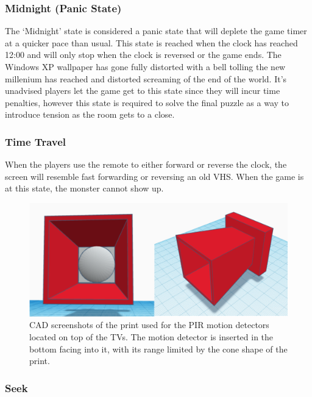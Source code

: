 \documentclass[conference]{IEEEtran}
\begin{document}
\subsubsection{Midnight (Panic State)}

\indent The `Midnight' state is considered a panic state that will deplete the game timer at a quicker pace than usual. This state is reached when
the clock has reached 12:00 and will only stop when the clock is reversed or the game ends. The Windows XP wallpaper has gone fully distorted with
a bell tolling the new millenium has reached and distorted screaming of the end of the world. It's unadvised players let the game get to this state
since they will incur time penalties, however this state is required to solve the final puzzle as a way to introduce tension as the room gets to a close.

\subsubsection{Time Travel}

\indent When the players use the remote to either forward or reverse the clock, the screen will resemble fast forwarding or reversing an old VHS. When
the game is at this state, the monster cannot show up.

\begin{figure}[ht]
    \centering
    \includegraphics[width=0.90\columnwidth]{Images/PIR.png}
    \caption{CAD screenshots of the print used for the PIR motion detectors located on top of the TVs.
    The motion detector is inserted in the bottom facing into it, with its range limited by the cone shape of the print.}
    \label{fig:pir}
\end{figure}

\subsubsection{Seek}
\end{document}
